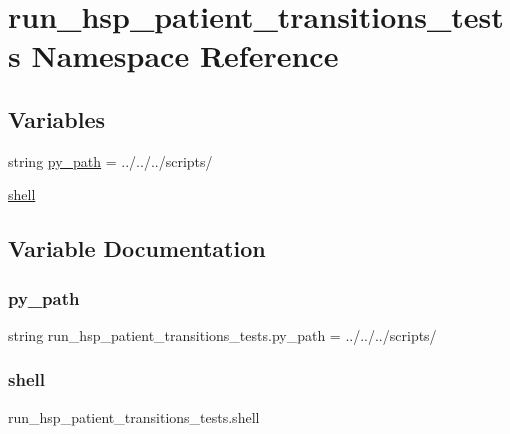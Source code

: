 \hypertarget{namespacerun__hsp__patient__transitions__tests}{}\section{run\+\_\+hsp\+\_\+patient\+\_\+transitions\+\_\+tests Namespace Reference}
\label{namespacerun__hsp__patient__transitions__tests}
\subsection*{Variables}
\begin{DoxyCompactItemize}
\item 
string \hyperlink{namespacerun__hsp__patient__transitions__tests_a7d5eae62c980d2d7e3efe9f77a069824}{py\+\_\+path} = \textquotesingle{}../../../scripts/\textquotesingle{}
\item 
\hyperlink{namespacerun__hsp__patient__transitions__tests_aa15f75ca6f5e107efac79c421977eeca}{shell}
\end{DoxyCompactItemize}


\subsection{Variable Documentation}
\mbox{\label{namespacerun__hsp__patient__transitions__tests_a7d5eae62c980d2d7e3efe9f77a069824}} 
\subsubsection{\texorpdfstring{py\+\_\+path}{py\_path}}
{\footnotesize\ttfamily string run\+\_\+hsp\+\_\+patient\+\_\+transitions\+\_\+tests.\+py\+\_\+path = \textquotesingle{}../../../scripts/\textquotesingle{}}

\mbox{\label{namespacerun__hsp__patient__transitions__tests_aa15f75ca6f5e107efac79c421977eeca}} 
\subsubsection{\texorpdfstring{shell}{shell}}
{\footnotesize\ttfamily run\+\_\+hsp\+\_\+patient\+\_\+transitions\+\_\+tests.\+shell}

